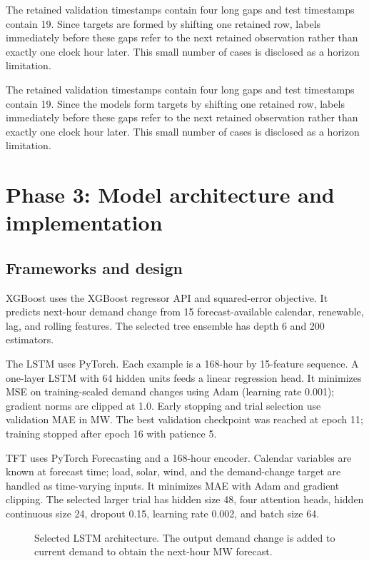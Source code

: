 \documentclass[11pt,a4paper]{article}
\begin{document}
The retained validation timestamps contain four long gaps and test timestamps contain 19. Since targets are formed by shifting one retained row, labels immediately before these gaps refer to the next retained observation rather than exactly one clock hour later. This small number of cases is disclosed as a horizon limitation.

The retained validation timestamps contain four long gaps and test timestamps contain 19. Since the models form targets by shifting one retained row, labels immediately before these gaps refer to the next retained observation rather than exactly one clock hour later. This small number of cases is disclosed as a horizon limitation.

\section{Phase 3: Model architecture and implementation}
\subsection{Frameworks and design}
XGBoost uses the XGBoost regressor API and squared-error objective. It predicts next-hour demand change from 15 forecast-available calendar, renewable, lag, and rolling features. The selected tree ensemble has depth 6 and 200 estimators.

The LSTM uses PyTorch. Each example is a 168-hour by 15-feature sequence. A one-layer LSTM with 64 hidden units feeds a linear regression head. It minimizes MSE on training-scaled demand changes using Adam (learning rate 0.001); gradient norms are clipped at 1.0. Early stopping and trial selection use validation MAE in MW. The best validation checkpoint was reached at epoch 11; training stopped after epoch 16 with patience 5.

TFT uses PyTorch Forecasting and a 168-hour encoder. Calendar variables are known at forecast time; load, solar, wind, and the demand-change target are handled as time-varying inputs. It minimizes MAE with Adam and gradient clipping. The selected larger trial has hidden size 48, four attention heads, hidden continuous size 24, dropout 0.15, learning rate 0.002, and batch size 64.

\begin{figure}[H]\centering
{}
\caption{Selected LSTM architecture. The output demand change is added to current demand to obtain the next-hour MW forecast.}\end{figure}
\end{document}
